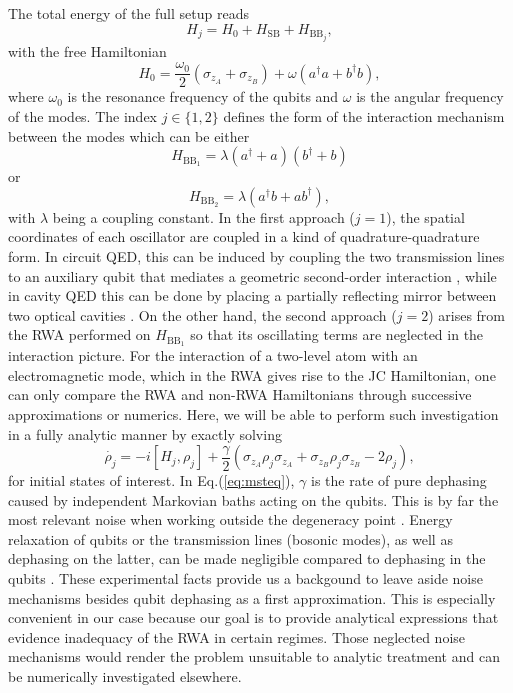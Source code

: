 \documentclass[%
reprint,
amsmath,amssymb,
aps,
pra,
]{revtex4-1}
\begin{document}
The total energy of the full setup reads
\begin{equation}
H_j = H_0+H_{\text{SB}}+H_{\text{BB}_j},
\label{eq:genH}
\end{equation}
with the free Hamiltonian 
\begin{equation}
H_0 = \frac{\omega_0}{2}\left(\sigma_{z_A}+\sigma_{z_B}\right)+\omega \left(a^{\dagger}a+b^{\dagger}b\right),
\label{eq:freeH}
\end{equation}
where $\omega_0$ is the resonance frequency of the qubits and $\omega$ is the angular frequency of the modes. The index $j\in\{1,2\}$ defines the form of the interaction mechanism between the modes which can be either
\begin{equation}
H_{\text{BB}_1} = \lambda\left(a^{\dagger}+a\right)\left(b^{\dagger}+b\right)
\label{eq:bb1H}
\end{equation}
or
\begin{equation}
H_{\text{BB}_2} = \lambda\left(a^{\dagger}b+a b^{\dagger}\right),
\label{eq:bb2H}
\end{equation}
with $\lambda$ being a coupling constant. In the first approach ($j=1$), the spatial coordinates of each oscillator are coupled in a kind of quadrature-quadrature form. In circuit QED,  this can be induced by coupling the two transmission lines to an auxiliary qubit that mediates a geometric second-order interaction \cite{sol08}, while in cavity QED this can be done by placing a partially reflecting mirror between two optical cavities \cite{har06}. On the other hand, the second approach ($j=2$) arises from the RWA performed on $H_{\text{BB}_1}$ so that its oscillating terms are neglected in the interaction picture. For the interaction of a two-level atom with an electromagnetic mode, which in the RWA gives rise to the JC Hamiltonian, one can only compare the RWA and non-RWA Hamiltonians through successive approximations or numerics. Here, we will be able to perform such investigation in a fully analytic manner by exactly solving
\begin{equation}
\dot{\rho_j}=-i\left[H_j,\rho_j\right]+\frac{\gamma}{2}\left(\sigma_{z_A}\rho_j\sigma_{z_A}+\sigma_{z_B}\rho_j\sigma_{z_B}-2\rho_j\right),
\label{eq:msteq}
\end{equation}
for initial states of interest. In Eq.(\ref{eq:msteq}),  $\gamma$ is the rate of pure dephasing caused by independent Markovian baths acting on the qubits. This is by far the most relevant noise when working outside the degeneracy point \cite{dp1,dp2}. Energy relaxation of qubits or the transmission lines (bosonic modes), as well as dephasing on the latter, can be made negligible compared to dephasing in the qubits \cite{bla04,bla07}. These experimental facts provide us a backgound to leave aside noise mechanisms besides qubit dephasing as a first approximation. This is especially convenient in our case because our goal is to provide analytical expressions that evidence inadequacy of the RWA in certain regimes. Those neglected noise mechanisms would render the problem unsuitable to analytic treatment and can be numerically investigated elsewhere.
\end{document}
